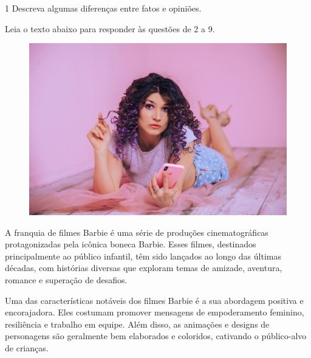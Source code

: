 
\num{1} Descreva algumas diferenças entre fatos e opiniões.


Leia o texto abaixo para responder às questões de 2 a 9.

\begin{myquote}

\begin{figure}[H]
\centering
\includegraphics[scale=0.25]{./imgSAEB_7_POR/media/image41.png}
\end{figure}


A franquia de filmes Barbie é uma série de produções cinematográficas
protagonizadas pela icônica boneca Barbie. Esses filmes, destinados
principalmente ao público infantil, têm sido lançados ao longo das últimas
décadas, com histórias diversas que exploram temas de amizade, aventura,
romance e superação de desafios.

Uma das características notáveis dos filmes Barbie é a sua abordagem
positiva e encorajadora. Eles costumam promover mensagens de empoderamento
feminino, resiliência e trabalho em equipe. Além disso, as animações e designs
de personagens são geralmente bem elaborados e coloridos, cativando o
público-alvo de crianças.


\end{myquote}
